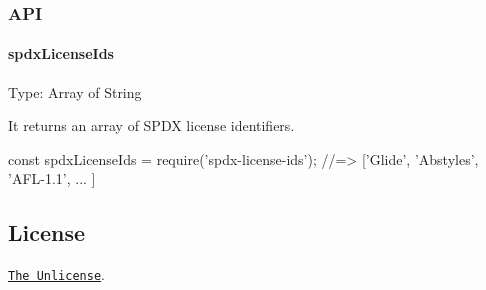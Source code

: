 \subsubsection*{A\+PI}

\paragraph*{spdx\+License\+Ids}

Type\+: {\ttfamily Array} of {\ttfamily String}

It returns an array of S\+P\+DX license identifiers.


\begin{DoxyCode}
const spdxLicenseIds = require('spdx-license-ids'); //=> ['Glide', 'Abstyles', 'AFL-1.1', ... ]
\end{DoxyCode}


\subsection*{License}

\href{./LICENSE}{\tt The Unlicense}. 